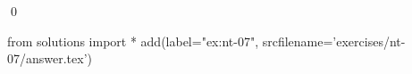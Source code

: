 
\begin{ex} 
  \label{ex:nt-07}
  
  \qed
\end{ex} 
\begin{python0}
from solutions import *
add(label="ex:nt-07",
    srcfilename='exercises/nt-07/answer.tex') 
\end{python0}
